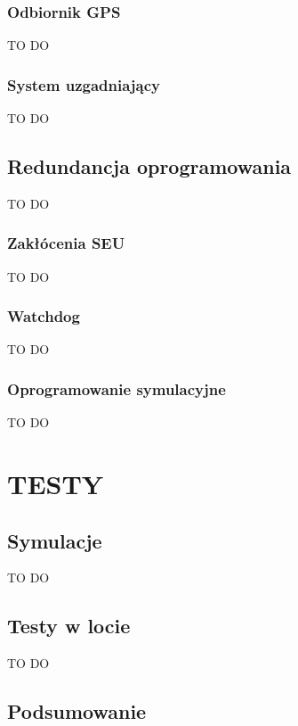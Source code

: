 \documentclass[a4paper, 12pt, twoside]{article}
\begin{document}
\subsubsection{Odbiornik GPS}
TO DO
\subsubsection{System uzgadniający}
TO DO

\subsection{Redundancja oprogramowania}
TO DO

\subsubsection{Zakłócenia SEU}
TO DO

\subsubsection{Watchdog}
TO DO

\subsubsection{Oprogramowanie symulacyjne}
TO DO



\newpage
\vspace*{1.5 cm}
\section{TESTY}
\vspace{3.0 cm}

\vspace{1.0 cm}
\subsection{Symulacje}
TO DO

\subsection{Testy w locie}
TO DO

\subsection{Podsumowanie}


\newpage
\vspace*{1.5 cm}
\end{document}

